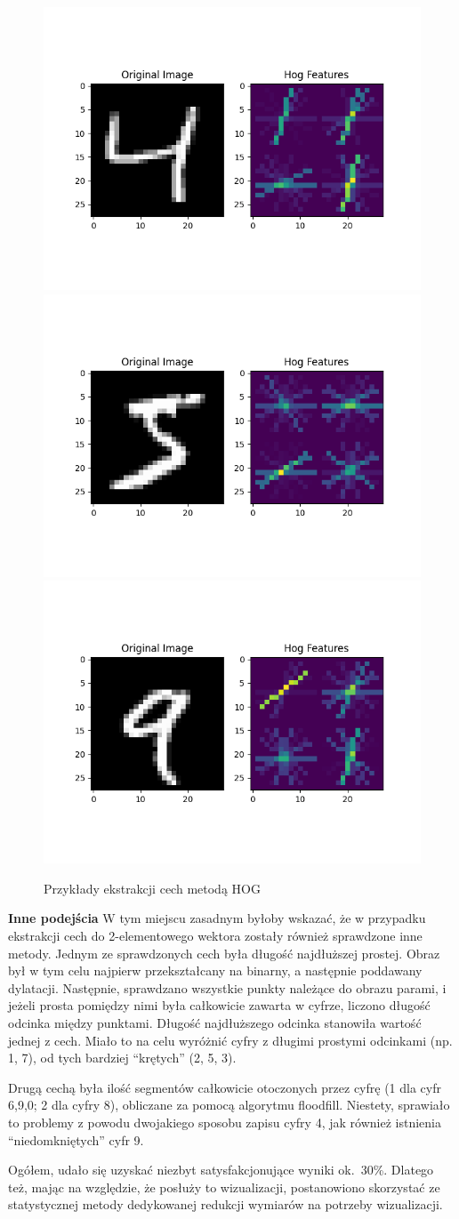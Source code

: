 \documentclass[10pt]{article}
\begin{document}
\begin{figure}[H]\centering
    \includegraphics[width=.32\linewidth]{img/hog_vis/4.png}
    \hfill
    \includegraphics[width=.32\linewidth]{img/hog_vis/5.png}
    \hfill
    \includegraphics[width=.32\linewidth]{img/hog_vis/9.png}
    \caption{Przykłady ekstrakcji cech metodą HOG}
\end{figure}

\scriptsize
\textbf{Inne podejścia} W tym miejscu zasadnym byłoby wskazać, że w przypadku ekstrakcji cech do 2-elementowego wektora zostały również sprawdzone inne metody.
Jednym ze sprawdzonych cech była długość najdłuższej prostej. Obraz był w tym celu najpierw przekształcany na binarny, a następnie poddawany dylatacji.
Następnie, sprawdzano wszystkie punkty należące do obrazu parami, i jeżeli prosta pomiędzy nimi była całkowicie zawarta w cyfrze, liczono długość odcinka między punktami.
Długość najdłuższego odcinka stanowiła wartość jednej z cech. Miało to na celu wyróżnić cyfry z długimi prostymi odcinkami (np. 1, 7), od tych bardziej ``krętych'' (2, 5, 3).

Drugą cechą była ilość segmentów całkowicie otoczonych przez cyfrę (1 dla cyfr 6,9,0; 2 dla cyfry 8), obliczane za pomocą algorytmu floodfill.
Niestety, sprawiało to problemy z powodu dwojakiego sposobu zapisu cyfry 4, jak również istnienia ``niedomkniętych'' cyfr 9.

Ogółem, udało się uzyskać niezbyt satysfakcjonujące wyniki ok.\ 30\%.
Dlatego też, mając na względzie, że posłuży to wizualizacji, postanowiono skorzystać ze statystycznej metody dedykowanej redukcji wymiarów na potrzeby wizualizacji.
\normalsize
\end{document}
